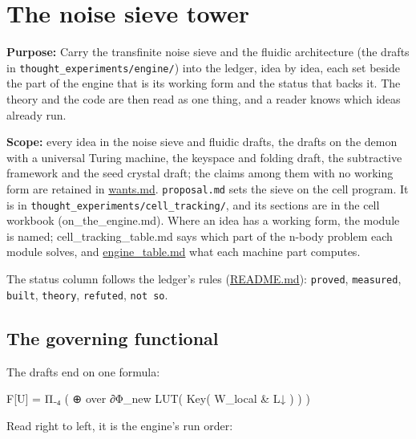 \chapter{\texorpdfstring{The noise sieve tower}{The noise sieve tower}}
\label{chap:noise-sieve-tower}

\textbf{Purpose:} Carry the transfinite noise sieve and the fluidic architecture (the drafts in \texttt{thought\_\allowbreak{}experiments/\allowbreak{}engine/\allowbreak{}}) into the ledger, idea by idea, each set beside the part of the engine that is its working form and the status that backs it. The theory and the code are then read as one thing, and a reader knows which ideas already run.

\textbf{Scope:} every idea in the noise sieve and fluidic drafts, the drafts on the demon with a universal Turing machine, the keyspace and folding draft, the subtractive framework and the seed crystal draft; the claims among them with no working form are retained in \hyperref[chap:wants]{wants.md}. \texttt{proposal.\allowbreak{}md} sets the sieve on the cell program. It is in \texttt{thought\_\allowbreak{}experiments/\allowbreak{}cell\_\allowbreak{}tracking/\allowbreak{}}, and its sections are in the cell workbook (on\_\allowbreak{}the\_\allowbreak{}engine.md). Where an idea has a working form, the module is named; cell\_\allowbreak{}tracking\_\allowbreak{}table.md says which part of the n-body problem each module solves, and \hyperref[chap:engine-table]{engine\_\allowbreak{}table.md} what each machine part computes.

The status column follows the ledger's rules (\hyperref[chap:readme]{README.md}): \texttt{proved}, \texttt{measured}, \texttt{built}, \texttt{theory}, \texttt{refuted}, \texttt{not so}.

\section{\texorpdfstring{The governing functional}{The governing functional}}

The drafts end on one formula:

F[U] = Π₋₄ ( ⊕ over ∂Φ\_\allowbreak{}new  LUT( Key( W\_\allowbreak{}local \& L↓ ) ) )

Read right to left, it is the engine's run order:

